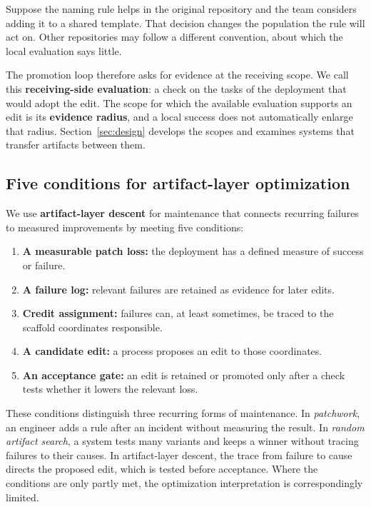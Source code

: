 Suppose the naming rule helps in the original repository and the team considers adding it to a shared template. That decision changes the population the rule will act on. Other repositories may follow a different convention, about which the local evaluation says little.

The promotion loop therefore asks for evidence at the receiving scope. We call this \textbf{receiving-side evaluation}: a check on the tasks of the deployment that would adopt the edit. The scope for which the available evaluation supports an edit is its \textbf{evidence radius}, and a local success does not automatically enlarge that radius. Section~\ref{sec:design} develops the scopes and examines systems that transfer artifacts between them.

\subsection{Five conditions for artifact-layer optimization}\label{five-conditions-for-artifact-layer-optimization}

We use \textbf{artifact-layer descent} for maintenance that connects recurring failures to measured improvements by meeting five conditions:

\begin{enumerate}
\def\labelenumi{\arabic{enumi}.}
\tightlist
\item
  \textbf{A measurable patch loss:} the deployment has a defined measure of success or failure.
\item
  \textbf{A failure log:} relevant failures are retained as evidence for later edits.
\item
  \textbf{Credit assignment:} failures can, at least sometimes, be traced to the scaffold coordinates responsible.
\item
  \textbf{A candidate edit:} a process proposes an edit to those coordinates.
\item
  \textbf{An acceptance gate:} an edit is retained or promoted only after a check tests whether it lowers the relevant loss.
\end{enumerate}

These conditions distinguish three recurring forms of maintenance. In \emph{patchwork}, an engineer adds a rule after an incident without measuring the result. In \emph{random artifact search}, a system tests many variants and keeps a winner without tracing failures to their causes. In artifact-layer descent, the trace from failure to cause directs the proposed edit, which is tested before acceptance. Where the conditions are only partly met, the optimization interpretation is correspondingly limited.

